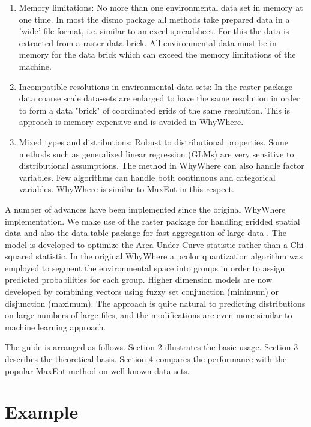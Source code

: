 \documentclass{article}
\newcommand{\pkg}[1]{{\fontseries{b}\selectfont #1}}
\begin{document}
\begin{enumerate}
  \item Memory limitations: No more than one environmental data set in memory at one time.  In most the \pkg{dismo} package all methods take prepared data in a 'wide' file format, i.e. similar to an excel spreadsheet.  For this the data is extracted from a raster data brick.  All environmental data must be in memory for the data brick which can exceed the memory limitations of the machine.  
  \item Incompatible resolutions in environmental data sets:  In the \pkg{raster} package data  coarse scale data-sets are enlarged to have the same resolution in order to form a data "brick" of coordinated grids of the same resolution.  This is approach is memory expensive and is avoided in \pkg{WhyWhere}.
  \item Mixed types and distributions: Robust to distributional properties. Some methods such as generalized linear regression (GLMs) are very sensitive to distributional assumptions. The method in \pkg{WhyWhere} can also handle factor variables.  Few algorithms can handle both continuous and categorical variables. \pkg{WhyWhere} is similar to MaxEnt in this respect.
\end{enumerate}

A number of advances have been implemented since the original \pkg{WhyWhere} implementation.  We make use of the \pkg{raster} package for handling gridded spatial data \cite{Etten2012} and also the \pkg{data.table} package for fast aggregation of large data \cite{Dowle2014}. The model is developed to optimize the Area Under Curve statistic rather than a Chi-squared statistic.  In the original WhyWhere \cite{Stockwell:2006xt} a pcolor quantization algorithm was employed to segment the environmental space into groups in order to assign predicted probabilities for each group.  Higher dimension models are now developed by combining vectors using fuzzy set conjunction (minimum) or disjunction (maximum). The approach is quite natural to predicting distributions on large numbers of large files, and the modifications are even more similar to machine learning approach.  

The guide is arranged as follows.  Section 2 illustrates the basic usage.  Section 3 describes the theoretical basis.  Section 4 compares the performance with the popular MaxEnt method on well known data-sets.

\section{Example}
\end{document}
